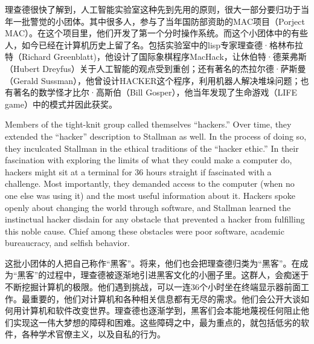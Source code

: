 \ifdefined\chs
理查德很快了解到，人工智能实验室这种先到先用的原则，很大一部分要归功于当年一批警觉的小团体。其中很多人，参与了当年国防部资助的MAC项目（Porject MAC）。在这个项目里，他们开发了第一个分时操作系统。而这个小团体中的有些人，如今已经在计算机历史上留了名。包括实验室中的lisp专家理查德·格林布拉特（Richard Greenblatt)，他设计了国际象棋程序MacHack，让休伯特·德莱弗斯（Hubert Dreyfus）关于人工智能的观点受到重创；还有著名的杰拉尔德·萨斯曼（Gerald Sussman），他曾设计HACKER这个程序，利用机器人解决堆垛问题；也有著名的数学怪才比尔·高斯伯（Bill Gosper），他当年发现了生命游戏（LIFE game）中的模式并因此获奖。
\fi

\ifdefined\eng
Members of the tight-knit group called themselves ``hackers.'' Over time, they extended the ``hacker'' description to Stallman as well. In the process of doing so, they inculcated Stallman in the ethical traditions of the ``hacker ethic.'' In their fascination with exploring the limits of what they could make a computer do, hackers might sit at a terminal for 36 hours straight if fascinated with a challenge. Most importantly, they demanded access to the computer (when no one else was using it) and the most useful information about it. Hackers spoke openly about changing the world through software, and Stallman learned the instinctual hacker disdain for any obstacle that prevented a hacker from fulfilling this noble cause. Chief among these obstacles were poor software, academic bureaucracy, and selfish behavior.
\fi

\ifdefined\chs
这批小团体的人把自己称作“黑客”。将来，他们也会把理查德归类为“黑客”。在成为“黑客”的过程中，理查德被逐渐地引进黑客文化的小圈子里。这群人，会痴迷于不断挖掘计算机的极限。他们遇到挑战，可以一连36个小时坐在终端显示器前面工作。最重要的，他们对计算机和各种相关信息都有无尽的需求。他们会公开大谈如何用计算机和软件改变世界。理查德也逐渐学到，黑客们会本能地蔑视任何阻止他们实现这一伟大梦想的障碍和困难。这些障碍之中，最为重点的，就包括低劣的软件，各种学术官僚主义，以及自私的行为。
\fi


